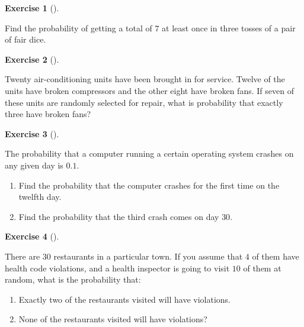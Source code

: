 \documentclass[
  letterpaper,
  DIV=11,
  numbers=noendperiod]{scrreprt}
\providecommand{\tightlist}{%
  \setlength{\itemsep}{0pt}\setlength{\parskip}{0pt}}\usepackage{longtable,booktabs,array}
\theoremstyle{definition}
\newtheorem{exercise}{Exercise}[chapter]
\theoremstyle{definition}
\theoremstyle{definition}
\theoremstyle{remark}
\begin{document}
\begin{exercise}[]\protect\hypertarget{exr-8.9}{}\label{exr-8.9}

Find the probability of getting a total of \(7\) at least once in three
tosses of a pair of fair dice.

\end{exercise}

\begin{exercise}[]\protect\hypertarget{exr-8.10}{}\label{exr-8.10}

Twenty air-conditioning units have been brought in for service. Twelve
of the units have broken compressors and the other eight have broken
fans. If seven of these units are randomly selected for repair, what is
probability that exactly three have broken fans?

\end{exercise}

\begin{exercise}[]\protect\hypertarget{exr-8.11}{}\label{exr-8.11}

The probability that a computer running a certain operating system
crashes on any given day is \(0.1\).

\begin{enumerate}
\def\labelenumi{\alph{enumi}.}
\tightlist
\item
  Find the probability that the computer crashes for the first time on
  the twelfth day.
\item
  Find the probability that the third crash comes on day \(30\).
\end{enumerate}

\end{exercise}

\begin{exercise}[]\protect\hypertarget{exr-8.12}{}\label{exr-8.12}

There are \(30\) restaurants in a particular town. If you assume that
\(4\) of them have health code violations, and a health inspector is
going to visit \(10\) of them at random, what is the probability that:

\begin{enumerate}
\def\labelenumi{\alph{enumi}.}
\tightlist
\item
  Exactly two of the restaurants visited will have violations.
\item
  None of the restaurants visited will have violations?
\end{enumerate}

\end{exercise}
\end{document}
